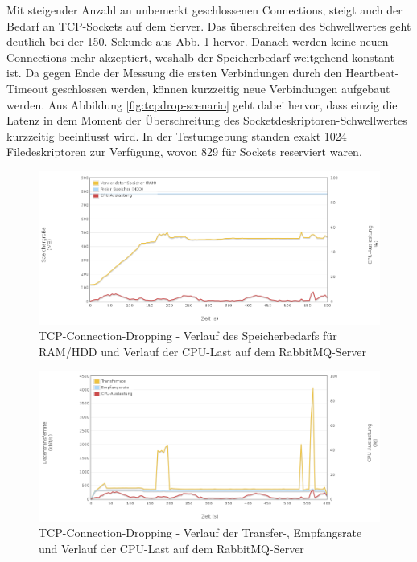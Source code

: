 \documentclass[	a4paper,
			11pt,
			oneside,
			parskip]{scrartcl}
\begin{document}
	
	\clearpage
		{%
		  \newline
		  \newline
		  \newline
		}{%
		 Mit steigender Anzahl an unbemerkt geschlossenen Connections, steigt auch der Bedarf an TCP-Sockets auf dem Server. Das überschreiten des Schwellwertes geht deutlich bei der 150. Sekunde aus Abb. \ref{fig:tcpdrop-server1}
		 hervor. Danach werden keine neuen Connections mehr akzeptiert, weshalb der Speicherbedarf weitgehend konstant ist. Da gegen Ende der Messung die ersten Verbindungen durch den Heartbeat-Timeout geschlossen werden, können kurzzeitig neue Verbindungen aufgebaut werden. Aus Abbildung \ref{fig:tcpdrop-scenario} geht dabei hervor, dass einzig die Latenz in dem Moment der Überschreitung des Socketdeskriptoren-Schwellwertes kurzzeitig beeinflusst wird. 
		}{%
		 In der Testumgebung standen exakt 1024 Filedeskriptoren zur Verfügung, wovon 829 für Sockets reserviert waren.
		}
		
		\begin{figure}[!htb]
			\centering
			\includegraphics[width=\textwidth]{img/tcpdrop/tcpdrop_server1.png}
			\caption{TCP-Connection-Dropping - Verlauf des Speicherbedarfs für RAM/HDD und Verlauf der CPU-Last auf dem RabbitMQ-Server}
			\label{fig:tcpdrop-server1}
		\end{figure}
		
		\begin{figure}[!htb]
			\centering
			\includegraphics[width=\textwidth]{img/tcpdrop/tcpdrop_server2.png}
			\caption{TCP-Connection-Dropping - Verlauf der Transfer-, Empfangsrate und Verlauf der CPU-Last auf dem RabbitMQ-Server}
			\label{fig:tcpdrop-server2}
		\end{figure}
		
\end{document}
